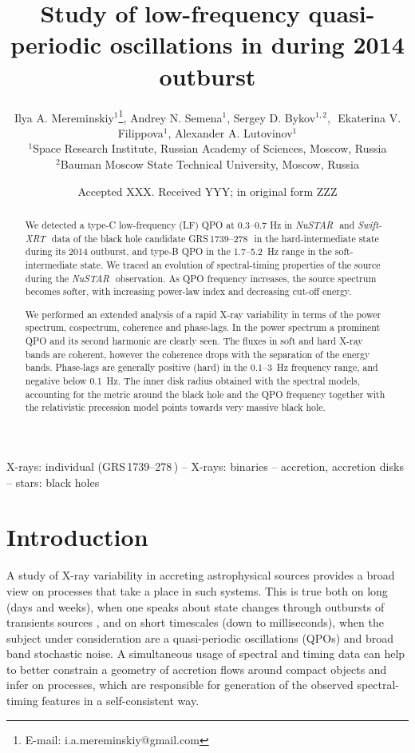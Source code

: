 \documentclass[a4paper,fleqn,usenatbib]{mnras}
\title[Low-frequency QPOs in  \grs]{Study of low-frequency quasi-periodic oscillations in \grs during 2014 outburst}
\author[I. A. Mereminskiy et al.]{
Ilya A. Mereminskiy$^{1}$\thanks{E-mail: i.a.mereminskiy@gmail.com},
Andrey N. Semena$^{1}$,
Sergey D. Bykov$^{1,2}$, \newauthor
\,\,Ekaterina V. Filippova$^{1}$,
Alexander A. Lutovinov$^{1}$
\\
$^{1}$Space Research Institute, Russian Academy of Sciences, Moscow, Russia\\
$^{2}$Bauman Moscow State Technical University, Moscow, Russia\\
}
\date{Accepted XXX. Received YYY; in original form ZZZ}
\def\grs{{GRS\,1739--278\,}}
\def\swiftx{{\em Swift-XRT\,}}
\def\nustar{{\em NuSTAR\,}}
\begin{document}
\label{firstpage}
\pagerange{\pageref{firstpage}--\pageref{lastpage}}
\maketitle

\begin{abstract}
We detected a type-C low-frequency (LF) QPO at 0.3--0.7 Hz in \nustar\, and \swiftx\, data of the black hole candidate \grs\, in the hard-intermediate state during its 2014 outburst, and type-B QPO in the 1.7--5.2~Hz range in the soft-intermediate state. We traced an evolution of spectral-timing properties of the source during the \nustar\, observation. 
As QPO frequency increases, the source spectrum becomes softer, with increasing power-law index and decreasing cut-off energy.

We performed an extended analysis of a rapid X-ray variability in terms of the power spectrum, cospectrum, coherence and phase-lags. 
In the power spectrum a prominent QPO and its second harmonic are clearly seen. 
The fluxes in soft and hard X-ray bands are coherent, however the coherence drops with the separation of the energy bands. 
Phase-lags are generally positive (hard) in the 0.1--3~Hz frequency range, and negative below 0.1~Hz.
The inner disk radius obtained with the spectral models, accounting for the metric around the black hole and the QPO frequency together with the relativistic precession model points towards very massive black hole.
\end{abstract}

\begin{keywords}
X-rays: individual (\grs) -- X-rays: binaries -- accretion, accretion disks  -- stars: black holes
\end{keywords}


\section{Introduction}
\label{sec:intro} 
A study of X-ray variability in accreting astrophysical sources provides a broad view on processes that take a place in such systems. 
This is true both on long (days and weeks), when one speaks about state changes through outbursts of transients sources \citep[see e.g.][]{homan05, heil15}, and on short timescales (down to milliseconds), when the subject under consideration are a quasi-periodic oscillations (QPOs) and broad band stochastic noise. 
A simultaneous usage of spectral and timing data can help to better constrain a geometry of accretion flows around compact objects and infer on processes, which are responsible for generation of the observed spectral-timing features in a self-consistent way.
\end{document}
